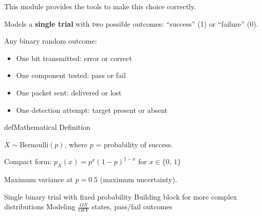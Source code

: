 This module provides the tools to make this choice correctly.



Models a \textbf{single trial} with two possible outcomes: ``success'' (1) or ``failure'' (0).


Any binary random outcome:

\begin{itemize}
\tightlist
\item
  One bit transmitted: error or correct
\item
  One component tested: pass or fail
\item
  One packet sent: delivered or lost
\item
  One detection attempt: target present or absent
\end{itemize}

\begin{PSbox}[unbreakable]{def}{Mathematical Definition}

$X \sim \mathrm{Bernoulli}(p)$, where $p$ = probability of success.

\end{PSbox}



Compact form: $p_{X}(x) = p^{x}(1-p)^{1-x}$ for $x \in \{0,\, 1\}$







Maximum variance at $p = 0.5$ (maximum uncertainty).


\PSyes{} Single binary trial with fixed probability\PSbr{}\PSyes{} Building block for more complex distributions\PSbr{}\PSyes{} Modeling $\frac{ON}{\mathrm{OFF}}$ states, pass/fail outcomes

